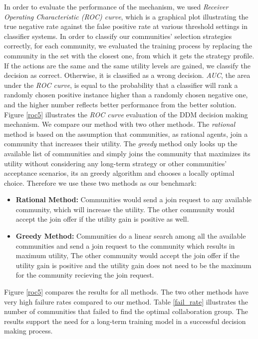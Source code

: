 In order to evaluate the performance of the mechanism, we used \emph{Receiver Operating Characteristic (ROC) curve}, which is a graphical plot illustrating the true negative rate against the false positive rate at various threshold settings in classifier systems. In order to classify our communities' selection strategies correctly, for each community, we evaluated the training process by replacing the community in the set with the closest one, from which it gets the strategy profile. If the actions are the same and the same utility levels are gained, we classify the decision as correct. Otherwise, it is classified as a wrong decision. \emph{AUC}, the area under the \emph{ROC curve}, is equal to the probability that a classifier will rank a randomly chosen positive instance higher than a randomly chosen negative one, and the higher number reflects better performance from the better solution.  Figure \ref{roc5} illustrates the \emph{ROC curve} evaluation of the DDM decision making mechanism. We compare our method with two other methods. The \emph{rational} method is based on the assumption that communities, as rational agents, join a community that increases their utility. The \emph{greedy} method only looks up the available list of communities and simply joins the community that maximizes its utility without considering any long-term strategy or other communities' acceptance scenarios, its an greedy algorithm and chooses a locally optimal choice. Therefore we use these two methods as our benchmark:

\begin{itemize}
  \item {\bf Rational Method:} Communities would send a join request to any available community, which will increase the utility. The other community would accept the join offer if the utility gain is positive as well.
	\item {\bf Greedy Method:} Communities do a linear search among all the available communities and send a join request to the community which results in maximum utility, The other community would accept the join offer if the utility gain is positive and the utility gain does not need to be the maximum for the community recieving the join request.
\end{itemize}

Figure \ref{roc5} compares the results for all methods. The two other methods have very high failure rates compared to our method. Table \ref{fail_rate} illustrates the number of communities that failed to find the optimal collaboration group. The results support the need for a long-term training model in a successful decision making process.

